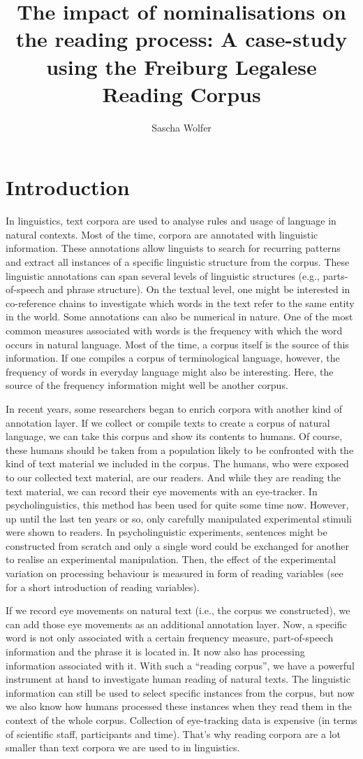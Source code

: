 \documentclass[output=paper]{langsci/langscibook}
\author{%
Sascha Wolfer\affiliation{Institute for the German Language, Mannheim}
}
\title{The impact of nominalisations on the reading process: A case-study using the Freiburg Legalese Reading Corpus}
\begin{document}
\section{Introduction}

In linguistics, text corpora are used to analyse rules and usage of language in natural contexts. Most of the time, corpora are annotated with linguistic information. These annotations allow linguists to search for recurring patterns and extract all instances of a specific linguistic structure from the corpus. These linguistic annotations can span several levels of linguistic structures (e.g., parts-of-speech and phrase structure). On the textual level, one might be interested in co-reference chains to investigate which words in the text refer to the same entity in the world. Some annotations can also be numerical in nature. One of the most common measures associated with words is the frequency with which the word occurs in natural language. Most of the time, a corpus itself is the source of this information. If one compiles a corpus of terminological language, however, the frequency of words in everyday language might also be interesting. Here, the source of the frequency information might well be another corpus.

In recent years, some researchers began to enrich corpora with another kind of annotation layer. If we collect or compile texts to create a corpus of natural language, we can take this corpus and show its contents to humans. Of course, these humans should be taken from a population likely to be confronted with the kind of text material we included in the corpus. The humans, who were exposed to our collected text material, are our readers. And while they are reading the text material, we can record their eye movements with an eye-tracker. In psycholinguistics, this method has been used for quite some time now. However, up until the last ten years or so, only carefully manipulated experimental stimuli were shown to readers. In psycholinguistic experiments, sentences might be constructed from scratch and only a single word could be exchanged for another to realise an experimental manipulation. Then, the effect of the experimental variation on processing behaviour is measured in form of reading variables (see  for a short introduction of reading variables). 

If we record eye movements on natural text (i.e., the corpus we constructed), we can add those eye movements as an additional annotation layer. Now, a specific word is not only associated with a certain frequency measure, part-of-speech information and the phrase it is located in. It now also has processing information associated with it. With such a “reading corpus”, we have a powerful instrument at hand to investigate human reading of natural texts. The linguistic information can still be used to select specific instances from the corpus, but now we also know how humans processed these instances when they read them in the context of the whole corpus. Collection of eye-tracking data is expensive (in terms of scientific staff, participants and time). That’s why reading corpora are a lot smaller than text corpora we are used to in linguistics.
\end{document}
